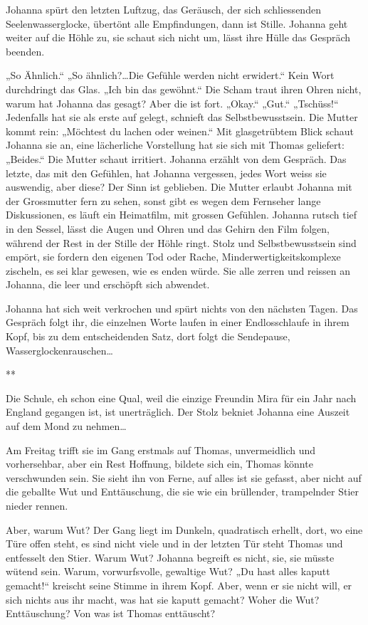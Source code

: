 \documentclass[10pt,a5paper]{book}
\newcommand{\sterne}{\par{\centering ***\par}}
\begin{document}
Johanna spürt den letzten Luftzug, das Geräusch, der sich schliessenden Seelenwasserglocke, übertönt alle Empfindungen, dann ist Stille. Johanna geht weiter auf die Höhle zu, sie schaut sich nicht um, lässt ihre Hülle das Gespräch beenden.

„So Ähnlich.“ „So ähnlich?\dots  Die Gefühle werden nicht erwidert.“ 
Kein Wort durchdringt das Glas. „Ich bin das gewöhnt.“ Die Scham traut ihren Ohren nicht, warum hat Johanna das gesagt? Aber die ist fort. „Okay.“ „Gut.“ „Tschüss!“ Jedenfalls hat sie als erste auf gelegt, schnieft das Selbstbewusstsein.
Die Mutter kommt rein: „Möchtest du lachen oder weinen.“ Mit glasgetrübtem Blick schaut  Johanna sie an, eine lächerliche Vorstellung hat sie sich mit Thomas geliefert: „Beides.“ Die Mutter schaut irritiert. Johanna erzählt von dem Gespräch. Das letzte, das mit den Gefühlen, hat Johanna vergessen, jedes Wort weiss sie auswendig, aber diese? Der Sinn ist geblieben.
Die Mutter erlaubt Johanna mit der Grossmutter fern zu sehen, sonst gibt es wegen dem Fernseher lange Diskussionen, es läuft ein Heimatfilm, mit grossen Gefühlen. Johanna rutsch tief in den Sessel, lässt die Augen und Ohren und das Gehirn den Film folgen, während der Rest in der Stille  der Höhle ringt. Stolz und Selbstbewusstsein sind empört, sie fordern den eigenen Tod oder Rache, Minderwertigkeitskomplexe zischeln, es sei klar gewesen, wie es enden würde. Sie alle zerren und reissen an Johanna, die leer und erschöpft sich abwendet.

Johanna hat sich weit verkrochen und spürt nichts von den nächsten Tagen. Das Gespräch folgt ihr, die einzelnen Worte laufen in einer Endlosschlaufe in ihrem Kopf, bis zu dem entscheidenden Satz, dort folgt die Sendepause, Wasserglockenrauschen\dots 


\sterne


Die Schule, eh schon eine Qual, weil die einzige Freundin Mira für ein Jahr nach England gegangen ist, ist unerträglich. Der Stolz bekniet Johanna eine Auszeit auf dem Mond zu nehmen\dots 

Am Freitag trifft sie im Gang erstmals auf Thomas, unvermeidlich und vorhersehbar, aber ein Rest Hoffnung, bildete sich ein, Thomas könnte verschwunden sein. Sie sieht ihn von Ferne, auf alles ist sie gefasst, aber nicht auf die geballte Wut und Enttäuschung, die sie wie ein brüllender, trampelnder Stier nieder rennen. 

Aber, warum Wut? Der Gang liegt im Dunkeln, quadratisch erhellt, dort, wo eine Türe offen steht, es  sind nicht viele und in der letzten Tür steht Thomas und entfesselt den Stier. Warum Wut? Johanna begreift es nicht, sie, sie müsste wütend sein. Warum, vorwurfsvolle, gewaltige Wut? „Du hast alles kaputt gemacht!“ kreischt seine Stimme in ihrem Kopf. Aber, wenn er sie nicht will, er sich nichts aus ihr macht, was hat sie kaputt gemacht? Woher die Wut? Enttäuschung? Von was ist Thomas enttäuscht?
\end{document}
